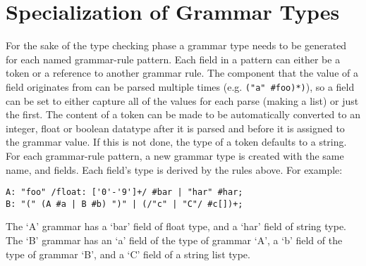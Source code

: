 
\section{Specialization of Grammar Types}
{
	For the sake of the type checking phase
	a grammar type needs to be generated for each named grammar-rule pattern.
	Each field in a pattern can either be a token or a reference to
	another grammar rule. The component that the value of a field
	originates from can be parsed multiple times (e.g. \texttt{("a" \#foo)*)}),
	so a field can be set to either capture all of the values for each
	parse (making a list) or just the first.
	The content of a token can be made to be
	automatically converted to an integer, float or
	boolean datatype after it is parsed and before it is assigned to the
	grammar value. If this is not done, the type of a token defaults to a string.
	For each grammar-rule pattern, a new grammar type is created with the
	same name, and fields. Each field's type is derived by the rules above.
	For example:
	
	\begin{lstlisting}[numbers=none, numbers = none, texcl = true, language = MAIA]
A: "foo" /float: ['0'-'9']+/ #bar | "har" #har;
B: "(" (A #a | B #b) ")" | (/"c" | "C"/ #c[])+;
	\end{lstlisting}
	
	The `A' grammar has a `bar' field of float type, and a `har' field of
	string type. The `B' grammar has an `a' field of the type of grammar `A',
	a `b' field of the type of grammar `B', and a `C' field of a
	string list type.
}
